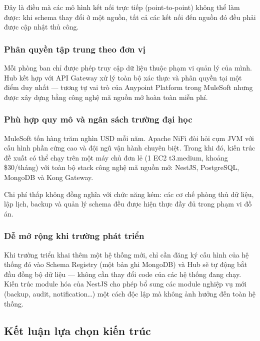 Đây là điều mà các mô hình kết nối trực tiếp (point-to-point) không thể làm được: khi schema thay đổi ở một nguồn, tất cả các kết nối đến nguồn đó đều phải được cập nhật thủ công.

\subsubsection{Phân quyền tập trung theo đơn vị}

Mỗi phòng ban chỉ được phép truy cập dữ liệu thuộc phạm vi quản lý của mình. Hub kết hợp với API Gateway xử lý toàn bộ xác thực và phân quyền tại một điểm duy nhất — tương tự vai trò của Anypoint Platform trong MuleSoft nhưng được xây dựng bằng công nghệ mã nguồn mở hoàn toàn miễn phí.

\subsubsection{Phù hợp quy mô và ngân sách trường đại học}

MuleSoft tốn hàng trăm nghìn USD mỗi năm. Apache NiFi đòi hỏi cụm JVM với cấu hình phần cứng cao và đội ngũ vận hành chuyên biệt. Trong khi đó, kiến trúc đề xuất có thể chạy trên một máy chủ đơn lẻ (1 EC2 t3.medium, khoảng \$30/tháng) với toàn bộ stack công nghệ mã nguồn mở: NestJS, PostgreSQL, MongoDB và Kong Gateway.

Chi phí thấp không đồng nghĩa với chức năng kém: các cơ chế phòng thủ dữ liệu, lập lịch, backup và quản lý schema đều được hiện thực đầy đủ trong phạm vi đồ án.

\subsubsection{Dễ mở rộng khi trường phát triển}

Khi trường triển khai thêm một hệ thống mới, chỉ cần đăng ký cấu hình của hệ thống đó vào Schema Registry (một bản ghi MongoDB) và Hub sẽ tự động bắt đầu đồng bộ dữ liệu — không cần thay đổi code của các hệ thống đang chạy. Kiến trúc module hóa của NestJS cho phép bổ sung các module nghiệp vụ mới (backup, audit, notification\ldots) một cách độc lập mà không ảnh hưởng đến toàn hệ thống.

\subsection{Kết luận lựa chọn kiến trúc}

